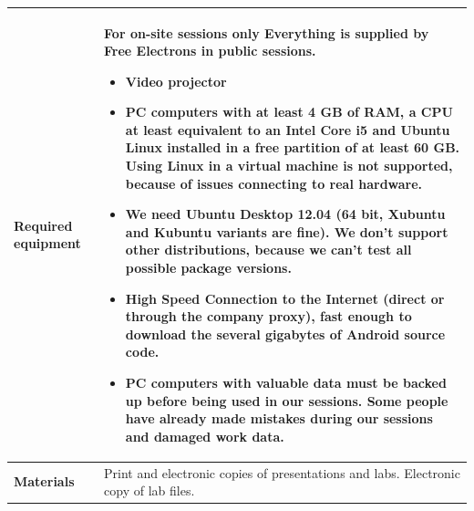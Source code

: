 \documentclass[a4paper,12pt,obeyspaces,spaces,hyphens]{article}
\begin{document}
{  \begin{tabularx}{\textwidth}{|g|h|}
    {\bf Required equipment} &
    {\bf For on-site sessions only}
    \newline Everything is supplied by Free Electrons in public sessions.
    \begin{itemize}
    \item Video projector
    \item PC computers with at least 4 GB of RAM, a CPU at least
      equivalent to an Intel Core i5 and Ubuntu Linux installed in a
      {\bf free partition of at least 60 GB. Using Linux in a virtual
        machine is not supported}, because of issues connecting to
      real hardware.
    \item We need Ubuntu Desktop 12.04 (64 bit, Xubuntu and Kubuntu
      variants are fine). We don't support other distributions,
      because we can't test all possible package versions.
    \item {\bf High Speed Connection to the Internet} (direct or
      through the company proxy), fast enough to download the several
      gigabytes of Android source code.
    \item {\bf PC computers with valuable data must be backed up}
      before being used in our sessions. Some people have already made
      mistakes during our sessions and damaged work data.
    \end{itemize} \\
    \hline

    {\bf Materials} & Print and electronic copies of presentations and
    labs.
    \newline Electronic copy of lab files.\\
    \hline

\end{tabularx}}
\normalsize
\end{document}
